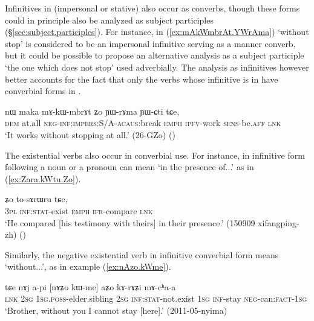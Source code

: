 Infinitives in  (impersonal or stative) also occur as converbs, though these forms could in principle also be analyzed as subject participles (§\ref{sec:subject.participles}). For instance, in (\ref{ex:mAkWmbrAt.YWrAma})  `without stop' is considered to be an impersonal infinitive serving as a manner converb, but it could be possible to propose an alternative analysis as a  subject participle `the one which does not stop' used adverbially.  The analysis as infinitives however better accounts for the fact that only the verbs whose infinitive is in  have converbial forms in .

\begin{exe}
\ex \label{ex:mAkWmbrAt.YWrAma}
 \gll nɯ maka mɤ-kɯ-mbrɤt ʑo ɲɯ-rɤma ɲɯ-ɕti tɕe,  \\
 \textsc{dem} at.all  \textsc{neg}-\textsc{inf}:\textsc{impers}:S/A-\textsc{acaus}:break \textsc{emph} \textsc{ipfv}-work \textsc{sens}-be.\textsc{aff} \textsc{lnk} \\
 \glt `It works without stopping at all.' (26-GZo)
()
\end{exe}

The existential verbs also occur in converbial use. For instance,  in infinitive form  following a noun or a pronoun can mean `in the presence of...' as in (\ref{ex:Zara.kWtu.Zo}).

\begin{exe}
\ex \label{ex:Zara.kWtu.Zo}
\gll [ʑara kɯ-tu] ʑo to-sɤrɯru tɕe, \\
\textsc{3pl} \textsc{inf}:\textsc{stat}-exist \textsc{emph} \textsc{ifr}-compare \textsc{lnk} \\
\glt `He compared [his testimony with theirs] in their presence.' (150909 xifangping-zh) ()
\end{exe}

Similarly, the negative existential verb  in infinitive converbial form means `without...', as in example  (\ref{ex:nAzo.kWme}).

\begin{exe}
\ex \label{ex:nAzo.kWme}
\gll tɕe nɤj a-pi [nɤʑo kɯ-me] aʑo kɤ-rɤʑi mɤ-cʰa-a \\
\textsc{lnk} \textsc{2sg} \textsc{1sg}.\textsc{poss}-elder.sibling \textsc{2sg} \textsc{inf}:\textsc{stat}-not.exist \textsc{1sg} \textsc{inf}-stay \textsc{neg}-can:\textsc{fact}-\textsc{1sg} \\
\glt `Brother, without you I cannot stay [here].' (2011-05-nyima)
\end{exe}

